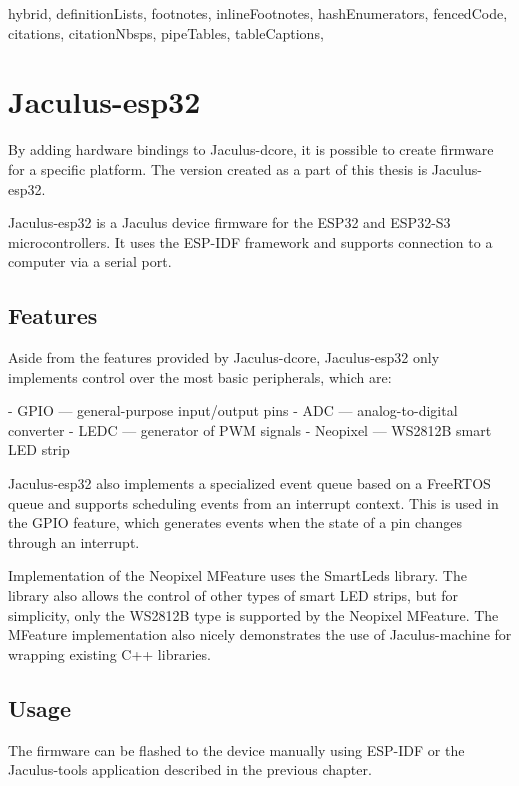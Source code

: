 \begin{markdown*}{%
  hybrid,
  definitionLists,
  footnotes,
  inlineFootnotes,
  hashEnumerators,
  fencedCode,
  citations,
  citationNbsps,
  pipeTables,
  tableCaptions,
}

\chapter{Jaculus-esp32}

By adding hardware bindings to Jaculus-dcore, it is possible to create firmware for a specific platform. The version created as a part of this thesis is Jaculus-esp32.

Jaculus-esp32 is a Jaculus device firmware for the ESP32 and ESP32-S3 microcontrollers. It uses the ESP-IDF framework and supports connection to a computer via a serial port.

\section{Features}

Aside from the features provided by Jaculus-dcore, Jaculus-esp32 only implements control over the most basic peripherals, which are:

  - GPIO --- general-purpose input/output pins
  - ADC --- analog-to-digital converter
  - LEDC --- generator of PWM signals
  - Neopixel --- WS2812B smart LED strip

Jaculus-esp32 also implements a specialized event queue based on a FreeRTOS queue and supports scheduling events from an interrupt context. This is used in the GPIO feature, which generates events when the state of a pin changes through an interrupt.

Implementation of the Neopixel MFeature uses the SmartLeds\cite{smartleds} library. The library also allows the control of other types of smart LED strips, but for simplicity, only the WS2812B type is supported by the Neopixel MFeature. The MFeature implementation also nicely demonstrates the use of Jaculus-machine for wrapping existing C++ libraries.

\section{Usage}

The firmware can be flashed to the device manually using ESP-IDF or the Jaculus-tools application described in the previous chapter.


\end{markdown*}
